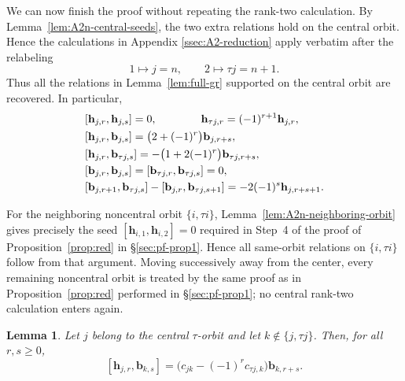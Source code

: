 \documentclass[11pt,reqno]{amsart}
\numberwithin{equation}{section}
\newtheorem{lem}[thm]{Lemma}
\theoremstyle{definition}
\theoremstyle{remark}
\newcommand{\bb}{\mathbf{b}}
\newcommand{\bh}{\mathbf{h}}
\newcommand{\gge}{\geqslant}
\begin{document}
We can now finish the proof without repeating the rank-two
calculation.  By Lemma~\ref{lem:A2n-central-seeds}, the two
extra relations hold on the central
orbit.  Hence the calculations in Appendix \ref{ssec:A2-reduction} apply verbatim after the
relabeling
\begin{equation*}
1\longmapsto j=n,
\qquad
2\longmapsto\tau j=n+1.
\end{equation*}
Thus all the relations in Lemma~\ref{lem:full-gr} supported on the
central orbit are recovered.  In particular,
\begin{align}
&[\bh_{j,r},\bh_{j,s}]
=0,
\qquad \qquad
\bh_{\tau j,r}
=(-1)^{r+1}\bh_{j,r},
\notag
\\
&[\bh_{j,r},\bb_{j,s}]
=
\bigl(2+(-1)^r\bigr)\bb_{j,r+s},
\notag
\\
&[\bh_{j,r},\bb_{\tau j,s}]
=
-\bigl(1+2(-1)^r\bigr)\bb_{\tau j,r+s},
\notag
\\
&[\bb_{j,r},\bb_{j,s}]
=
[\bb_{\tau j,r},\bb_{\tau j,s}]
=0,
\notag
\\
&[\bb_{j,r+1},\bb_{\tau j,s}]
-
[\bb_{j,r},\bb_{\tau j,s+1}]
=
-2(-1)^s\bh_{j,r+s+1}.
\label{eq:A2n-central-mixed-full}
\end{align}

For the neighboring noncentral orbit $\{i,\tau i\}$,
Lemma~\ref{lem:A2n-neighboring-orbit} gives precisely the seed
$[\bh_{i,1},\bh_{i,2}]=0$ required in Step~4 of the proof of
Proposition~\ref{prop:red} in \S\ref{sec:pf-prop1}.  Hence all same-orbit relations on
$\{i,\tau i\}$ follow from that argument.  Moving successively away
from the center, every remaining noncentral orbit is treated by the
same proof as in Proposition~\ref{prop:red} performed in \S\ref{sec:pf-prop1}; no central rank-two
calculation enters again.

\begin{lem}\label{lem:A2n-central-cross-hb}
Let $j$ belong to the central $\tau$-orbit and let
$k\notin\{j,\tau j\}$.  Then, for all $r,s\gge 0$,
\begin{equation}\label{eq:A2n-central-cross-hb}
 [\bh_{j,r},\bb_{k,s}]
 =
 \bigl(c_{jk}-(-1)^r c_{\tau j,k}\bigr)
 \bb_{k,r+s}.
\end{equation}
\end{lem}
\end{document}
